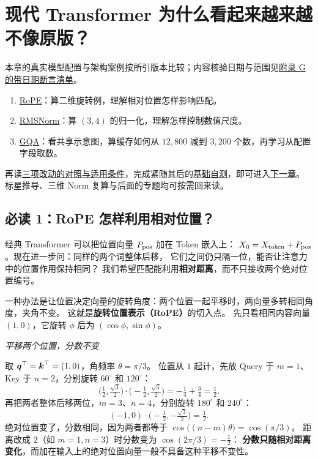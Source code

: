 \chapterrule
\section{现代 Transformer 为什么看起来越来越不像原版？}
\label{intro:modern-transformers}
本章的真实模型配置与架构案例按所引版本比较；内容核验日期与范围见\hyperref[app:dated-claims]{附录 G 的带日期断言清单}。

\begin{boundarybox}[title={首次阅读：只走完这三步}]
\begin{enumerate}[itemsep=1pt,topsep=2pt]
\item \hyperref[sec:modern-rope]{RoPE}：算二维旋转例，理解相对位置怎样影响匹配。
\item \hyperref[sec:modern-rmsnorm]{RMSNorm}：算 $(3,4)$ 的归一化，理解怎样控制数值尺度。
\item \hyperref[sec:modern-gqa]{GQA}：看共享示意图，算缓存如何从 $12{,}800$ 减到 $3{,}200$ 个数，再学习从配置字段取数。
\end{enumerate}
再读\hyperref[sec:modern-core-comparison]{三项改动的对照与适用条件}，完成紧随其后的\hyperref[check:modern-transformers]{基础自测}，即可进入\hyperref[intro:evaluating-models]{下一章}。
标星推导、三维 Norm 复算与后面的专题均可按需回来读。
\end{boundarybox}

\subsection{必读 1：RoPE 怎样利用相对位置？}
\label{sec:modern-rope}
\label{concept:rope}

经典 Transformer 可以把位置向量 $P_{\rm pos}$ 加在 Token 嵌入上：
$X_0=X_{\rm token}+P_{\rm pos}$。现在进一步问：同样的两个词整体后移，
它们之间仍只隔一位，能否让注意力中的位置作用保持相同？
我们希望匹配能利用\textbf{相对距离}，而不只接收两个绝对位置编号。

一种办法是让位置决定向量的旋转角度：两个位置一起平移时，两向量多转相同角度，夹角不变。
这就是\textbf{旋转位置表示（RoPE）}的切入点。
先只看相同内容向量 $(1,0)$，它旋转 $\phi$ 后为 $(\cos\phi,\sin\phi)$。

\begin{example}
\noindent\emph{平移两个位置，分数不变}\par

取 $\boldsymbol{q}^\top=\boldsymbol{k}^\top=(1,0)$，角频率 $\theta=\pi/3$。
位置从 $1$ 起计，先放 Query 于 $m=1$、Key 于 $n=2$，分别旋转 $60^\circ$ 和 $120^\circ$：
\[
\bigl(\tfrac12,\tfrac{\sqrt3}2\bigr)\cdot
\bigl(-\tfrac12,\tfrac{\sqrt3}2\bigr)=-\tfrac14+\tfrac34=\boxed{\tfrac12}.
\]
再把两者整体后移两位，$m=3$、$n=4$，分别旋转 $180^\circ$ 和 $240^\circ$：
\[
(-1,0)\cdot\bigl(-\tfrac12,-\tfrac{\sqrt3}2\bigr)=\boxed{\tfrac12}.
\]
绝对位置变了，分数相同，因为两者都等于 $\cos\bigl((n-m)\theta\bigr)=\cos(\pi/3)$。
距离改成 $2$（如 $m=1,n=3$）时分数变为 $\cos(2\pi/3)=-\tfrac12$：
\textbf{分数只随相对距离变化}，而加在输入上的绝对位置向量一般不具备这种平移不变性。
\end{example}

